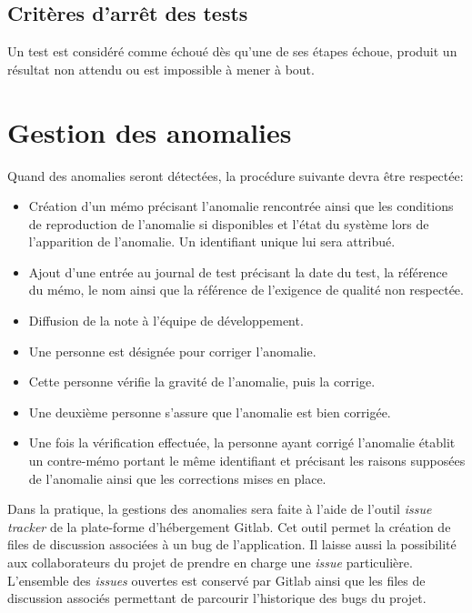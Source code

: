 \documentclass{../res/univ-projet}
\begin{document}
\subsection{Critères d'arrêt des tests}

Un test est considéré comme échoué dès qu'une de ses étapes échoue, produit un résultat non attendu ou est impossible à mener à bout.


\section{Gestion des anomalies}

Quand des anomalies seront détectées, la procédure suivante devra être respectée:
  \begin{itemize}
   \item Création d'un mémo précisant l'anomalie rencontrée ainsi que les conditions de reproduction de l'anomalie si disponibles et l'état du système lors de l'apparition de l'anomalie.  
   Un identifiant unique lui sera attribué.
   \item Ajout d'une entrée au journal de test précisant la date du test, la référence du mémo, le nom ainsi que la référence de l'exigence de 
   qualité non respectée.
   \item Diffusion de la note à l'équipe de développement.
   \item Une personne est désignée pour corriger l'anomalie.
   \item Cette personne vérifie la gravité de l'anomalie, puis la corrige.
   \item Une deuxième personne s'assure que l'anomalie est bien corrigée.
   \item Une fois la vérification effectuée, la personne ayant corrigé l'anomalie établit un contre-mémo portant le même identifiant et précisant les raisons supposées 
   de l'anomalie ainsi que les corrections mises en place.
  \end{itemize}
  

  Dans la pratique, la gestions des anomalies sera faite à l'aide de l'outil \emph{issue tracker} de
  la plate-forme d'hébergement Gitlab. Cet outil permet la création de files de discussion associées à un bug
  de l'application. Il laisse aussi la possibilité aux collaborateurs du projet de prendre en charge 
  une \emph{issue} particulière. L'ensemble des \emph{issues} ouvertes est conservé par Gitlab ainsi
  que les files de discussion associés permettant de parcourir l'historique des bugs du projet.
\end{document}
